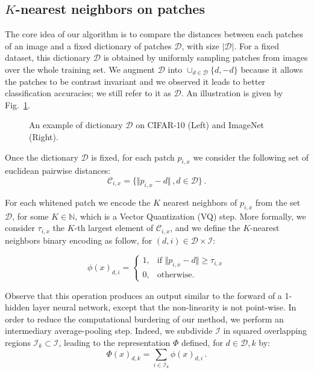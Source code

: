 \documentclass{article}
\begin{document}
{\subsection{$K$-nearest neighbors on patches}

The core idea of our algorithm is to compare the distances between each patches of an image and a fixed dictionary of patches $\mathcal{D}$, with size $|\mathcal{D}|$.
For a fixed dataset, this dictionary $\mathcal{D}$ is obtained by uniformly sampling patches from images over the whole training set. We augment $\mathcal{D}$ into $\cup_{d\in \mathcal{D}}\{d,-d\}$ because it allows the patches to be contrast invariant and we observed it leads to better classification accuracies; we still refer to it as $\mathcal{D}$. An illustration is given by Fig.~\ref{dico}.

\begin{figure}
  \centering
  \fbox{\rule[-.5cm]{0cm}{4cm} \rule[-.5cm]{4cm}{0cm}}
  \caption{An example of dictionary $\mathcal{D}$ on CIFAR-10 (Left) and ImageNet (Right).\label{dico}}
\end{figure}

Once the dictionary $\mathcal{D}$ is fixed, for each patch $p_{i,x}$ we consider the following set of euclidean pairwise distances:
\[\mathcal{C}_{i, x} =\{\Vert p_{i, x} - d \Vert\,, d\in\mathcal{D} \}\,.\]
 
For each whitened patch we encode the $K$ nearest neighbors of $p_{i,x}$ from the set $\mathcal{D}$, for some $ K \in \mathbb{N}$, which is a Vector Quantization (VQ) step.
More formally, we consider $\tau_{i,x}$ the $K$-th largest element of $\mathcal{C}_{i,x}$, and we define the $K$-nearest neighbors binary encoding as follow, for $(d,i)\in\mathcal{D}\times\mathcal{I}$:


\begin{equation}
\phi(x)_{d,i}=
\begin{cases}
1,&\text{if } \Vert  p_{i,x} - d\Vert \geq \tau_{i,x}\\
0,&\text{otherwise}.
\end{cases}
\end{equation}






Observe that this operation produces an output similar to the forward of a 1-hidden layer neural network, except that the non-linearity is not point-wise. In order to reduce the computational burdering of our method, we perform an intermediary average-pooling step.
Indeed, we subdivide $\mathcal{I}$ in squared overlapping regions $\mathcal{I}_k\subset\mathcal{I}$, leading to the representation $\Phi$ defined, for $d\in\mathcal{D}, k$ by:
\[\Phi(x)_{d,k}= \sum_{i\in \mathcal{I}_k}\phi(x)_{d,i}\,.\]

}
\end{document}
